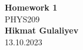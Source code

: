 \begin{titlepage}
    \begin{center}
    {\fontsize{40}{48}\selectfont \bfseries Homework 1} 
    \\\vspace{20pt}
    {\LARGE PHYS209} \\
    \vspace{20pt}
    \textbf{Hikmat Gulaliyev}
    \vspace{8pt}
    \\ 13.10.2023
    \end{center}
\end{titlepage}